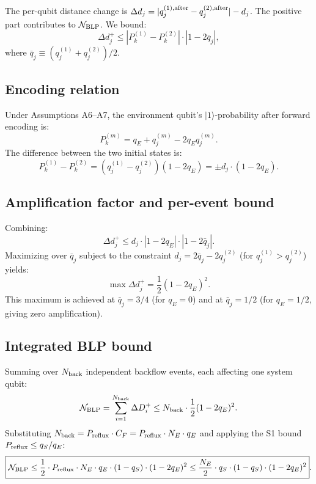 \documentclass[aps,prl,twocolumn]{revtex4-2}
\begin{document}
The per-qubit distance change is $\Delta d_j = |q_j^{(1),{\rm after}} - q_j^{(2),{\rm after}}| - d_j$. The positive part contributes to $\mathcal{N}_{\rm BLP}$. We bound:
\begin{equation}
\Delta d_j^+ \leq |P_k^{(1)} - P_k^{(2)}| \cdot |1 - 2\bar{q}_j|,
\end{equation}
where $\bar{q}_j \equiv (q_j^{(1)} + q_j^{(2)})/2$.

\subsection{Encoding relation}

Under Assumptions A6--A7, the environment qubit's $|1\rangle$-probability after forward encoding is:
\begin{equation}
P_k^{(m)} = q_E + q_j^{(m)} - 2q_E q_j^{(m)}.
\end{equation}
The difference between the two initial states is:
\begin{equation}
P_k^{(1)} - P_k^{(2)} = (q_j^{(1)} - q_j^{(2)})(1 - 2q_E) = \pm d_j \cdot (1 - 2q_E).
\end{equation}

\subsection{Amplification factor and per-event bound}

Combining:
\begin{equation}
\Delta d_j^+ \leq d_j \cdot |1 - 2q_E| \cdot |1 - 2\bar{q}_j|.
\end{equation}
Maximizing over $\bar{q}_j$ subject to the constraint $d_j = 2\bar{q}_j - 2q_j^{(2)}$ (for $q_j^{(1)} > q_j^{(2)}$) yields:
\begin{equation}
\max \Delta d_j^+ = \frac{1}{2}(1 - 2q_E)^2.
\end{equation}
This maximum is achieved at $\bar{q}_j = 3/4$ (for $q_E=0$) and at $\bar{q}_j = 1/2$ (for $q_E=1/2$, giving zero amplification).

\subsection{Integrated BLP bound}

Summing over $N_{\rm back}$ independent backflow events, each affecting one system qubit:
\begin{equation}
\mathcal{N}_{\rm BLP} = \sum_{i=1}^{N_{\rm back}} \Delta D_i^+ \leq N_{\rm back} \cdot \frac{1}{2}(1 - 2q_E)^2.
\end{equation}
Substituting $N_{\rm back} = P_{\rm reflux} \cdot C_F = P_{\rm reflux} \cdot N_E \cdot q_E$ and applying the S1 bound $P_{\rm reflux} \leq q_S/q_E$:
\begin{equation}
\boxed{\mathcal{N}_{\rm BLP} \leq \frac{1}{2} \cdot P_{\rm reflux} \cdot N_E \cdot q_E \cdot (1 - q_S) \cdot (1 - 2q_E)^2 \leq \frac{N_E}{2} \cdot q_S \cdot (1 - q_S) \cdot (1 - 2q_E)^2}.
\end{equation}
\end{document}
